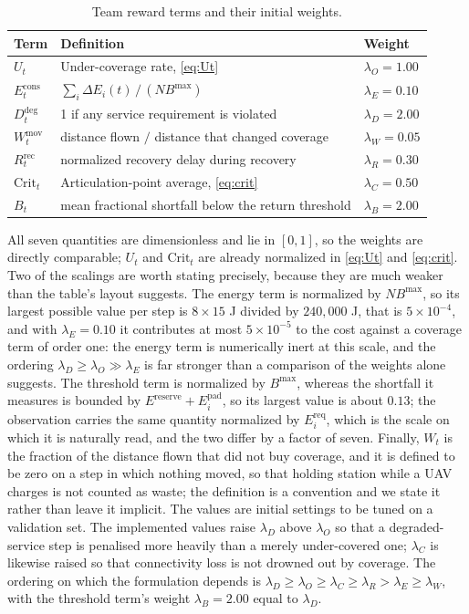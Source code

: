 \documentclass[conference]{IEEEtran}
\begin{document}
\begin{table}[t]
\caption{Team reward terms and their initial weights.}
\label{tab:reward}
\centering
\scriptsize
\renewcommand{\arraystretch}{1.06}
\begin{tabularx}{\columnwidth}{@{}L{1.45cm}L{2.95cm}Y@{}}
\toprule
Term & Definition & Weight \\
\midrule
$U_t$ & Under-coverage rate, \eqref{eq:Ut} & $\lambda_O = 1.00$ \\
$E_t^{\mathrm{cons}}$ & $\sum_i\Delta E_i(t)\,/\,(N B^{\max})$ & $\lambda_E = 0.10$ \\
$D_t^{\mathrm{deg}}$ & 1 if any service requirement is violated & $\lambda_D = 2.00$ \\
$W_t^{\mathrm{mov}}$ & distance flown $/$ distance that changed coverage & $\lambda_W = 0.05$ \\
$R_t^{\mathrm{rec}}$ & normalized recovery delay during recovery & $\lambda_R = 0.30$ \\
$\mathrm{Crit}_t$ & Articulation-point average, \eqref{eq:crit} & $\lambda_C = 0.50$ \\
$B_t$ & mean fractional shortfall below the return threshold & $\lambda_B = 2.00$ \\
\bottomrule
\end{tabularx}
\end{table}

All seven quantities are dimensionless and lie in $[0,1]$, so the weights are directly comparable; $U_t$ and $\mathrm{Crit}_t$ are already normalized in \eqref{eq:Ut} and \eqref{eq:crit}.  Two of the scalings are worth stating precisely, because they are much weaker than the table's layout suggests.  The energy term is normalized by $N B^{\max}$, so its largest possible value per step is $8\times15$ J divided by $240{,}000$ J, that is $5\times10^{-4}$, and with $\lambda_E=0.10$ it contributes at most $5\times10^{-5}$ to the cost against a coverage term of order one: the energy term is numerically inert at this scale, and the ordering $\lambda_D \ge \lambda_O \gg \lambda_E$ is far stronger than a comparison of the weights alone suggests.  The threshold term is normalized by $B^{\max}$, whereas the shortfall it measures is bounded by $E^{\mathrm{reserve}}+E_i^{\mathrm{pad}}$, so its largest value is about $0.13$; the observation carries the same quantity normalized by $E_i^{\mathrm{req}}$, which is the scale on which it is naturally read, and the two differ by a factor of seven.  Finally, $W_t$ is the fraction of the distance flown that did not buy coverage, and it is defined to be zero on a step in which nothing moved, so that holding station while a UAV charges is not counted as waste; the definition is a convention and we state it rather than leave it implicit. The values are initial settings to be tuned on a validation set. The implemented values raise $\lambda_D$ above $\lambda_O$ so that a degraded-service step is penalised more heavily than a merely under-covered one; $\lambda_C$ is likewise raised so that connectivity loss is not drowned out by coverage. The ordering on which the formulation depends is $\lambda_D \ge \lambda_O \ge \lambda_C \ge \lambda_R > \lambda_E \ge \lambda_W$, with the threshold term's weight $\lambda_B = 2.00$ equal to $\lambda_D$.
\end{document}
